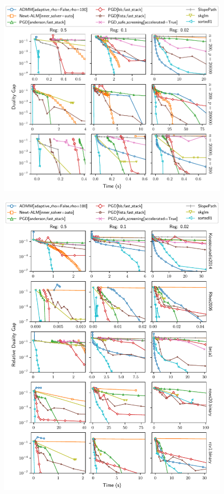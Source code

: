 \documentclass[article]{jss}
\makeatletter
\let\natwidth\Gin@nat@width
\makeatother
\begin{document}
\begin{figure}[htpb]
  \centering
  \includegraphics[width=\natwidth]{images/benchmark_single_simulated.pdf}
  \caption{%
  }
  \label{fig:simulated-data-single}
\end{figure}

\begin{figure}[htpb]
  \centering
  \includegraphics[width=\natwidth]{images/benchmark_single_real.pdf}
  \caption{%
  }
\end{figure}
\end{document}
